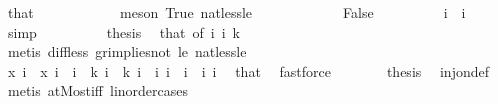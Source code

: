 \begin{isabellebody}
\ that\ {\isacharasterisk}{\kern0pt}\ \isanewline
\ \ \ \ \ \ \ \ \isamarkupfalse%
\ {\isacharparenleft}{\kern0pt}meson\ True\ nat{\isacharunderscore}{\kern0pt}less{\isacharunderscore}{\kern0pt}le{\isacharparenright}{\kern0pt}\isanewline
\ \ \ \ \isamarkupfalse%
\isanewline
\ \ \ \ \ \ \isamarkupfalse%
\ False\isanewline
\ \ \ \ \ \ \isamarkupfalse%
\ \isamarkupfalse%
\ {\isachardoublequoteopen}i{}\ {\isacharless}{\kern0pt}\ i{}{\isachardoublequoteclose}\ \isamarkupfalse%
\ simp\isanewline
\ \ \ \ \ \ \isamarkupfalse%
\ \isamarkupfalse%
\ {\isacharquery}{\kern0pt}thesis\ \isamarkupfalse%
\ that\ {\isacharasterisk}{\kern0pt}{\isacharbrackleft}{\kern0pt}of\ i{}\ i{}{\isacharbrackright}{\kern0pt}\ {\isacartoucheopen}k\ {\isachargreater}{\kern0pt}\ {}{\isacartoucheclose}\ \ \isanewline
\ \ \ \ \ \ \ \ \isamarkupfalse%
\ {\isacharparenleft}{\kern0pt}metis\ diff{\isacharunderscore}{\kern0pt}less\ gr{\isacharunderscore}{\kern0pt}implies{\isacharunderscore}{\kern0pt}not{}\ le{}\ nat{\isacharunderscore}{\kern0pt}less{\isacharunderscore}{\kern0pt}le{\isacharparenright}{\kern0pt}\isanewline
\ \ \ \ \isamarkupfalse%
\isanewline
\ \ \ \ \isamarkupfalse%
\ \isamarkupfalse%
\ {\isachardoublequoteopen}x\ i{}\ {\isasymnoteq}\ x\ i{}{\isachardoublequoteclose}\ \ {\isachardoublequoteopen}i{}\ {\isasymle}\ k{\isachardoublequoteclose}\ {\isachardoublequoteopen}i{}\ {\isasymle}\ k{\isachardoublequoteclose}\ {\isachardoublequoteopen}i{}\ {\isasymnoteq}\ i{}{\isachardoublequoteclose}\ {\isachardoublequoteopen}i{}\ {\isacharless}{\kern0pt}\ i{}{\isachardoublequoteclose}\ \ i{}\ i{}\ \isamarkupfalse%
\ that\ \isamarkupfalse%
\ fastforce\isanewline
\ \ \ \ \isamarkupfalse%
\ \isamarkupfalse%
\ {\isacharquery}{\kern0pt}thesis\ \isamarkupfalse%
\ inj{\isacharunderscore}{\kern0pt}on{\isacharunderscore}{\kern0pt}def\ \ \isamarkupfalse%
\ {\isacharparenleft}{\kern0pt}metis\ atMost{\isacharunderscore}{\kern0pt}iff\ linorder{\isacharunderscore}{\kern0pt}cases{\isacharparenright}{\kern0pt}\isanewline
\ \ \isamarkupfalse%
\isanewline

\end{isabellebody}

